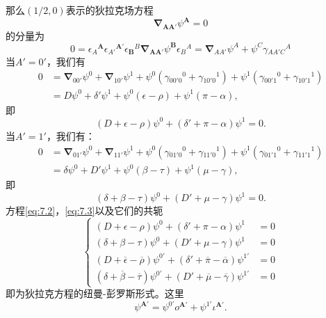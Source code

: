 那么$( 1/2,0)$表示的狄拉克场方程
\begin{equation*}
	\mathbf{\nabla }_{\boldsymbol{AA} '} \psi ^{\boldsymbol{A}} =0
\end{equation*}
的分量为
\begin{equation*}
	0=\epsilon {_{A}}^{\boldsymbol{A}} \epsilon {_{A'}}^{\boldsymbol{A} '} \epsilon {_{\boldsymbol{B}}}^{B}\mathbf{\nabla }_{\boldsymbol{AA} '} \psi ^{\boldsymbol{B}} \epsilon {_{B}}^{A} =\mathbf{\nabla }_{AA'} \psi ^{A} +\psi ^{C} \gamma {_{AA'C}}^{A}
\end{equation*}
当$A'=0'$，我们有
\begin{equation*}
	\begin{aligned}
		0 & =\mathbf{\nabla }_{00'} \psi ^{0} +\mathbf{\nabla }_{10'} \psi ^{1} +\psi ^{0} (\gamma {_{00'0}}^{0} +\gamma {_{10'0}}^{1} )+\psi ^{1} (\gamma {_{00'1}}^{0} +\gamma {_{10'1}}^{1} )\\
		& =D\psi ^{0} +\delta '\psi ^{1} +\psi ^{0} (\epsilon -\rho )+\psi ^{1} (\pi -\alpha ),
	\end{aligned}
\end{equation*}
即
\begin{equation}
	( D+\epsilon -\rho ) \psi ^{0} +( \delta '+\pi -\alpha ) \psi ^{1} =0.
	\label{eq:7.2}
\end{equation}
当$A'=1'$，我们有：
\begin{equation*}
	\begin{aligned}
		0 & =\mathbf{\nabla }_{01'} \psi ^{0} +\mathbf{\nabla }_{11'} \psi ^{1} +\psi ^{0} (\gamma {_{01'0}}^{0} +\gamma {_{11'0}}^{1} )+\psi ^{1} (\gamma {_{01'1}}^{0} +\gamma {_{11'1}}^{1} )\\
		& =\delta \psi ^{0} +D'\psi ^{1} +\psi ^{0}( \beta -\tau ) +\psi ^{1}( \mu -\gamma ) ,
	\end{aligned}
\end{equation*}
即
\begin{equation}
	( \delta +\beta -\tau ) \psi ^{0} +( D'+\mu -\gamma ) \psi ^{1} =0.
	\label{eq:7.3}
\end{equation}
方程\ref{eq:7.2}，\ref{eq:7.3}以及它们的共轭
\begin{equation}
	\begin{cases}
		( D+\epsilon -\rho ) \psi ^{0} +( \delta '+\pi -\alpha ) \psi ^{1} & =0\\
		( \delta +\beta -\tau ) \psi ^{0} +( D'+\mu -\gamma ) \psi ^{1} & =0\\
		( D+\overline{\epsilon } -\overline{\rho }) \psi ^{0'} +( \delta '+\overline{\pi } -\overline{\alpha }) \psi ^{1'} & =0\\
		( \delta +\overline{\beta } -\overline{\tau }) \psi ^{0'} +( D'+\overline{\mu } -\overline{\gamma }) \psi ^{1'} & =0
	\end{cases}
	\label{eq:7.4}
\end{equation}
即为狄拉克方程的纽曼-彭罗斯形式。这里
\begin{equation*}
	\psi ^{\boldsymbol{A} '} =\psi ^{0'} o^{\boldsymbol{A} '} +\psi ^{1'} \iota ^{\boldsymbol{A} '} .
\end{equation*}


